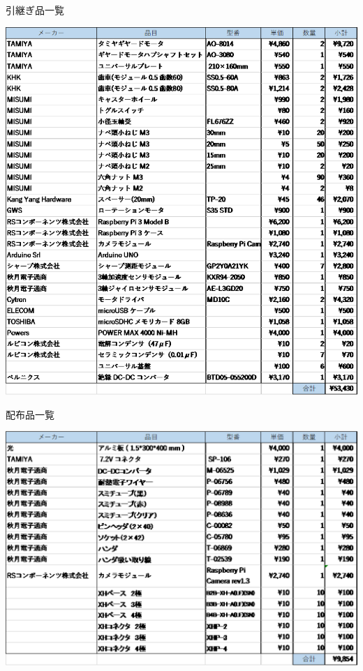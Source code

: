 \documentclass[11pt,a4]{jsarticle}
\begin{document}
\begin{table}[h]
	\centering
	\caption{引継ぎ品一覧}
	\includegraphics[clip,scale=0.35]{../items/hikitsugi.eps}
 \label{hikitsugi}
\end{table}

\begin{table}[h]
	\centering
	\caption{配布品一覧}
	\includegraphics[clip,scale=0.35]{../items/haihu.eps}
    \label{haihu}
\end{table}
\end{document}
